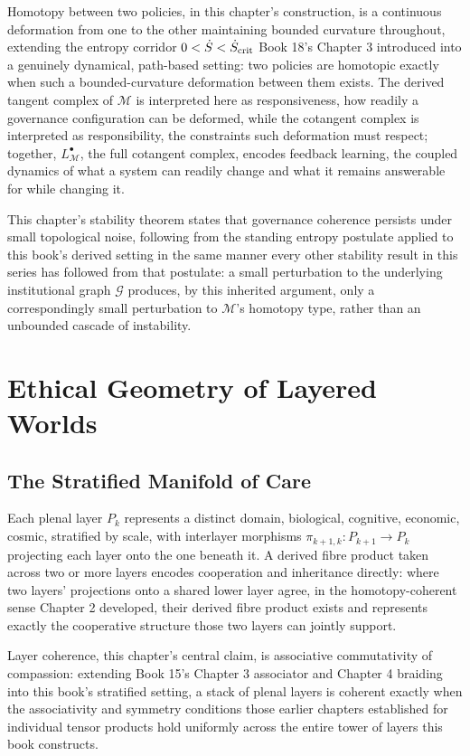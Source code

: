 Homotopy between two policies, in this chapter's construction, is a continuous deformation from one to the other maintaining bounded curvature throughout, extending the entropy corridor $0 < \dot{S} < \dot{S}_{\text{crit}}$ Book 18's Chapter 3 introduced into a genuinely dynamical, path-based setting: two policies are homotopic exactly when such a bounded-curvature deformation between them exists. The derived tangent complex of $\mathcal{M}$ is interpreted here as responsiveness, how readily a governance configuration can be deformed, while the cotangent complex is interpreted as responsibility, the constraints such deformation must respect; together, $L_{\mathcal{M}}^{\bullet}$, the full cotangent complex, encodes feedback learning, the coupled dynamics of what a system can readily change and what it remains answerable for while changing it.

This chapter's stability theorem states that governance coherence persists under small topological noise, following from the standing entropy postulate applied to this book's derived setting in the same manner every other stability result in this series has followed from that postulate: a small perturbation to the underlying institutional graph $\mathcal{G}$ produces, by this inherited argument, only a correspondingly small perturbation to $\mathcal{M}$'s homotopy type, rather than an unbounded cascade of instability.

\part{Ethical Geometry of Layered Worlds}

\chapter{The Stratified Manifold of Care}

Each plenal layer $P_k$ represents a distinct domain, biological, cognitive, economic, cosmic, stratified by scale, with interlayer morphisms $\pi_{k+1,k}: P_{k+1} \to P_k$ projecting each layer onto the one beneath it. A derived fibre product taken across two or more layers encodes cooperation and inheritance directly: where two layers' projections onto a shared lower layer agree, in the homotopy-coherent sense Chapter 2 developed, their derived fibre product exists and represents exactly the cooperative structure those two layers can jointly support.

Layer coherence, this chapter's central claim, is associative commutativity of compassion: extending Book 15's Chapter 3 associator and Chapter 4 braiding into this book's stratified setting, a stack of plenal layers is coherent exactly when the associativity and symmetry conditions those earlier chapters established for individual tensor products hold uniformly across the entire tower of layers this book constructs.

